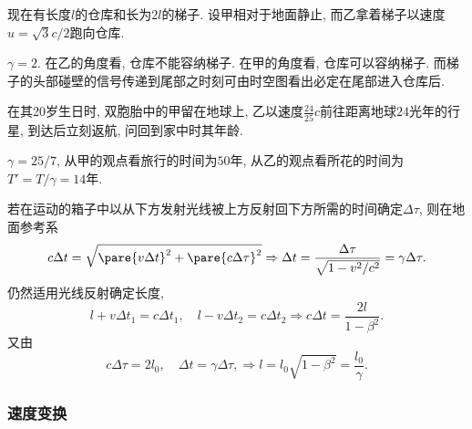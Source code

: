 \documentclass[hidelinks]{ctexart}
\begin{document}
\begin{sample}
    \begin{ex}
        现在有长度$l$的仓库和长为$2l$的梯子. 设甲相对于地面静止, 而乙拿着梯子以速度$u = \sqrt{3}c/2$跑向仓库.
    \end{ex}
    \begin{solution}
        $\gamma = 2$. 在乙的角度看, 仓库不能容纳梯子. 在甲的角度看, 仓库可以容纳梯子. 而梯子的头部碰壁的信号传递到尾部之时刻可由时空图看出必定在尾部进入仓库后.
    \end{solution}
\end{sample}
\begin{sample}
    \begin{ex}
        在其20岁生日时, 双胞胎中的甲留在地球上, 乙以速度$\displaystyle \frac{24}{25}c$前往距离地球$24$光年的行星, 到达后立刻返航, 问回到家中时其年龄.
    \end{ex}
    \begin{solution}
        $\gamma = 25/7$, 从甲的观点看旅行的时间为$50$年, 从乙的观点看所花的时间为$T' = T/\gamma = 14$年.
    \end{solution}
\end{sample}
若在运动的箱子中以从下方发射光线被上方反射回下方所需的时间确定$\Delta \tau$, 则在地面参考系
\[ c\Delta t = \sqrt{\pare{v\Delta t}^2 + \pare{c\Delta \tau}^2} \Rightarrow \Delta t= \frac{\Delta\tau}{\sqrt{1-v^2/c^2}} = \gamma\Delta \tau. \]
仍然适用光线反射确定长度,
\[ l + v\Delta t_1 = c\Delta t_1,\quad l - v\Delta t_2 = c\Delta t_2 \Rightarrow c\Delta t = \frac{2l}{1-\beta^2}. \]
又由
\[ c\Delta \tau = 2l_0,\quad \Delta t = \gamma \Delta \tau, \Rightarrow l = l_0 \sqrt{1-\beta^2} = \frac{l_0}{\gamma}. \]


\subsubsection{速度变换} %
\label{ssub:速度变换}
\end{document}
